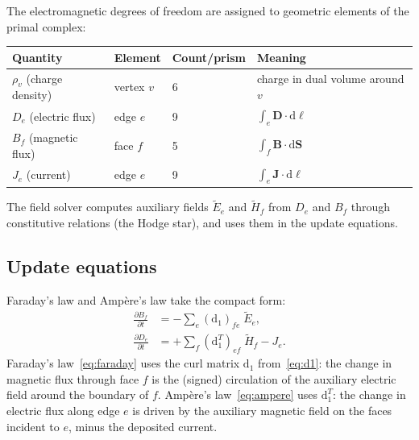 \documentclass[11pt,a4paper]{article}
\newcommand{\dd}{\mathrm{d}}
\begin{document}
The electromagnetic degrees of freedom are assigned to geometric elements of
the primal complex:

\begin{center}
\begin{tabular}{llll}
  \toprule
  Quantity & Element & Count/prism & Meaning \\
  \midrule
  $\rho_v$ (charge density) & vertex $v$ & 6
    & charge in dual volume around $v$ \\
  $D_e$ (electric flux) & edge $e$ & 9
    & $\int_e \bm{D}\cdot\dd\bm{\ell}$ \\
  $B_f$ (magnetic flux) & face $f$ & 5
    & $\int_f \bm{B}\cdot\dd\bm{S}$ \\
  $J_e$ (current) & edge $e$ & 9
    & $\int_e \bm{J}\cdot\dd\bm{\ell}$ \\
  \bottomrule
\end{tabular}
\end{center}

The field solver computes auxiliary fields $\widetilde{E}_e$ and
$\widetilde{H}_f$ from $D_e$ and $B_f$ through constitutive relations (the
Hodge star), and uses them in the update equations.

\subsection{Update equations}
\label{sec:update_eqs}

Faraday's law and Amp\`ere's law take the compact form:
\begin{align}
  \frac{\partial B_f}{\partial t}
    &= -\sum_e (\dd_1)_{fe}\;\widetilde{E}_e,
    \label{eq:faraday} \\
  \frac{\partial D_e}{\partial t}
    &= +\sum_f (\dd_1^T)_{ef}\;\widetilde{H}_f - J_e.
    \label{eq:ampere}
\end{align}
Faraday's law~\eqref{eq:faraday} uses the curl matrix $\dd_1$
from~\eqref{eq:d1}: the change in magnetic flux through face $f$ is the
(signed) circulation of the auxiliary electric field around the boundary of $f$.
Amp\`ere's law~\eqref{eq:ampere} uses $\dd_1^T$: the change in electric
flux along edge $e$ is driven by the auxiliary magnetic field on the faces
incident to $e$, minus the deposited current.
\end{document}
